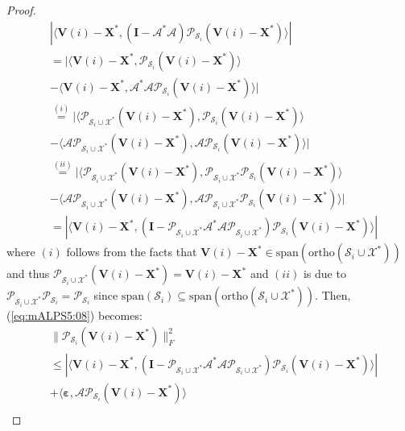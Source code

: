 \documentclass[twocolumn]{svjour3}
\newcommand{\vectornormbig}[1]{\big\|#1\big\|}
\newcommand{\sensing}{\boldsymbol{\mathcal{A}}}
\newcommand{\bestsignal}{\boldsymbol{X}^\ast}
\newcommand{\noise}{\boldsymbol{\varepsilon}}
\newcommand{\id}{\mathbf{I}}
\begin{document}
\begin{proof}
\begin{align}
&| \langle \boldsymbol{V}(i) - \bestsignal, (\id - \sensing^\ast \sensing)\mathcal{P}_{\mathcal{S}_i}(\boldsymbol{V}(i) - \bestsignal) \rangle | \nonumber \\ 
&= | \langle \boldsymbol{V}(i) - \bestsignal, \mathcal{P}_{\mathcal{S}_i}(\boldsymbol{V}(i) - \bestsignal) \rangle  \nonumber \\ &- \langle \boldsymbol{V}(i) - \bestsignal, \sensing^\ast \sensing\mathcal{P}_{\mathcal{S}_i}(\boldsymbol{V}(i) - \bestsignal) \rangle | \nonumber\\
&\stackrel{(i)}{=} | \langle \mathcal{P}_{\mathcal{S}_i \cup \mathcal{X}^\ast}(\boldsymbol{V}(i) - \bestsignal), \mathcal{P}_{\mathcal{S}_i}(\boldsymbol{V}(i) - \bestsignal) \rangle  \nonumber \\ &- \langle \sensing \mathcal{P}_{\mathcal{S}_i \cup \mathcal{X}^\ast} (\boldsymbol{V}(i) - \bestsignal), \sensing \mathcal{P}_{\mathcal{S}_i}(\boldsymbol{V}(i) - \bestsignal) \rangle | \nonumber \\
&\stackrel{(ii)}{=} | \langle \mathcal{P}_{\mathcal{S}_i \cup \mathcal{X}^\ast}(\boldsymbol{V}(i) - \bestsignal), \mathcal{P}_{\mathcal{S}_i \cup \mathcal{X}^\ast}\mathcal{P}_{\mathcal{S}_i}(\boldsymbol{V}(i) - \bestsignal) \rangle  \nonumber \\ &- \langle \sensing \mathcal{P}_{\mathcal{S}_i \cup \mathcal{X}^\ast} (\boldsymbol{V}(i) - \bestsignal), \sensing \mathcal{P}_{\mathcal{S}_i \cup \mathcal{X}^\ast} \mathcal{P}_{\mathcal{S}_i}(\boldsymbol{V}(i) - \bestsignal) \rangle | \nonumber \\
&= | \langle \boldsymbol{V}(i) - \bestsignal, (\id - \mathcal{P}_{\mathcal{S}_i \cup \mathcal{X}^\ast}\sensing^\ast \sensing\mathcal{P}_{\mathcal{S}_i \cup \mathcal{X}^\ast})\mathcal{P}_{\mathcal{S}_i}(\boldsymbol{V}(i) - \bestsignal) \rangle |  \nonumber
\end{align} where $ (i) $ follows from the facts that $ \boldsymbol{V}(i) - \bestsignal \in \text{span}(\text{ortho}(\mathcal{S}_i \cup \mathcal{X}^\ast)) $ and thus $ \mathcal{P}_{\mathcal{S}_i \cup \mathcal{X}^{\ast}}(\boldsymbol{V}(i) - \bestsignal) = \boldsymbol{V}(i) - \bestsignal $ and $ (ii) $ is due to $ \mathcal{P}_{\mathcal{S}_i \cup \mathcal{X}^\ast} \mathcal{P}_{\mathcal{S}_i} = \mathcal{P}_{\mathcal{S}_i} $ since $ \text{span}(\mathcal{S}_i) \subseteq \text{span}(\text{ortho}(\mathcal{S}_i \cup \mathcal{X}^\ast)) $. Then, (\ref{eq:mALPS5:08}) becomes:
\begin{align}
&\vectornormbig{\mathcal{P}_{\mathcal{S}_i}(\boldsymbol{V}(i) - \bestsignal)}_F^2 \nonumber \\ &\leq | \langle \boldsymbol{V}(i) - \bestsignal, (\id - \mathcal{P}_{\mathcal{S}_i \cup \mathcal{X}^\ast}\sensing^\ast \sensing\mathcal{P}_{\mathcal{S}_i \cup \mathcal{X}^\ast})\mathcal{P}_{\mathcal{S}_i}(\boldsymbol{V}(i) - \bestsignal) \rangle |  \nonumber \\ &+ \langle \noise, \sensing \mathcal{P}_{\mathcal{S}_i}(\boldsymbol{V}(i) - \bestsignal) \rangle \nonumber \\

\end{align}
\end{proof}
\end{document}
